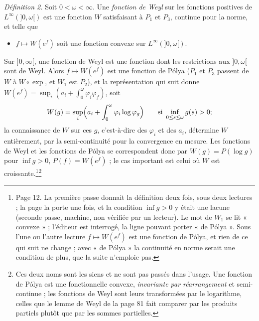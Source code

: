 \documentclass[11pt,a4paper]{article}
\begin{document}
\emph{Définition 2.} Soit $0 < \omega < \infty$. Une \emph{fonction de Weyl}
sur les fonctions positives de $L^\infty(]0,\omega[)$ est une fonction $W$
satisfaisant à $P_1$ et $P_3$, continue pour la norme, et telle que
\begin{itemize}
  \item[$W_1$)] $f \mapsto W(e^{f})$ soit une fonction convexe sur
    $L^\infty(]0,\omega[)$.
\end{itemize}
Sur $]0,\infty[$, une fonction de Weyl est une fonction dont les
restrictions aux $]0,\omega[$ sont de Weyl. Alors $f \mapsto W(e^f)$ est une
fonction de Pólya ($P_1$ et $P_3$ passent de $W$ à $W\circ\exp$, et $W_1$
est $P_2$), et la représentation qui suit donne $W(e^f) = \sup_i (a_i +
\int_0^\omega \varphi_i\varphi_f)$, soit
\[
  W(g) = \sup_i \Bigl( a_i + \int_0^{\omega} \varphi_i \log\varphi_g \Bigr)
  \qquad \text{si } \inf_{0 \leq s \leq \omega} g(s) > 0 ;
\]
la connaissance de $W$ sur ces $g$, c'est-à-dire des $\varphi_i$ et des
$a_i$, détermine $W$ entièrement, par la semi-continuité pour la convergence
en mesure. Les fonctions de Weyl et les fonctions de Pólya se correspondent
donc par $W(g) = P(\log g)$ pour $\inf g > 0$, $P(f) = W(e^f)$ ; le cas
important est celui où $W$ est croissante.\footnote{Page 12. La première
passe donnait la définition deux fois, sous deux lectures ; la page la porte
une fois, et la condition $\inf g > 0$ y était une lacune (seconde passe,
machine, non vérifiée par un lecteur). Le mot de $W_1$ se lit « convexe » ;
l'éditeur est interrogé, la ligne pouvant porter « de Pólya ». Sous l'une
ou l'autre lecture $f \mapsto W(e^f)$ est une fonction de Pólya, et rien de
ce qui suit ne change ; avec « de Pólya » la continuité en norme serait une
condition de plus, que la suite n'emploie pas.}\footnote{Ces
deux noms sont les siens et ne sont pas passés dans l'usage. Une fonction de
Pólya est une fonctionnelle convexe, \emph{invariante par réarrangement} et
semi-continue ; les fonctions de Weyl sont leurs transformées par le
logarithme, celles que le lemme de Weyl de la page 81 fait comparer par les
produits partiels plutôt que par les sommes partielles.}
\end{document}
